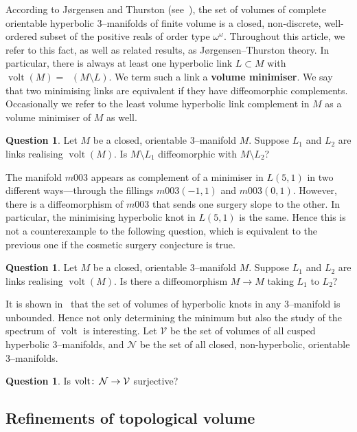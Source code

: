 \documentclass[a4paper]{gtart}
\theoremstyle{definition}
\newtheorem{question}[proposition]{Question}
\theoremstyle{remark}
\numberwithin{equation}{section}
\DeclareMathOperator{\volt}{volt}
\DeclareMathOperator{\volh}{vol_{\mathbb{H}}}
\begin{document}
According to J\o{}rgensen and Thurston (see~\cite{thurston-notes,Gro81, Mai10}), the set of volumes of complete orientable hyperbolic 3--manifolds of finite volume is a closed, non-discrete, well-ordered subset of the positive reals of order type $\omega^\omega.$ Throughout this article, we refer to this fact, as well as related results, as J\o{}rgensen--Thurston theory. In particular, there is always at least one hyperbolic link  $L \subset M$ with $\volt(M) = \volh(M\setminus L)$. We term such a link a \textbf{volume minimiser}. We say that two minimising links are equivalent if they have diffeomorphic complements. Occasionally we refer to the least volume hyperbolic link complement in $M$ as a volume minimiser of $M$ as well. 

\begin{question}
Let $M$ be a closed, orientable $3$--manifold $M$. Suppose $L_1$ and $L_2$ are links realising $\volt(M)$. Is $M \setminus L_1$ diffeomorphic with $M \setminus L_2$?
\end{question}

The manifold $m003$ appears as complement of a minimiser in $L(5,1)$ in two different ways---through the fillings $m003(-1, 1)$ and $m003(0, 1).$ However, there is a diffeomorphism of $m003$ that sends one surgery slope to the other. In particular, the minimising hyperbolic knot in $L(5,1)$ is the same. Hence this is not a counterexample to the following question, which is equivalent to the previous one if the cosmetic surgery conjecture is true.

\begin{question}
Let $M$ be a closed, orientable $3$--manifold $M$. Suppose $L_1$ and $L_2$ are links realising $\volt(M)$. Is there a diffeomorphism $M\to M$ taking  $L_1$ to $L_2$?
\end{question}

It is shown in~\cite{Adams_unbounded_volume} that the set of volumes of hyperbolic knots in any 3--manifold is unbounded. Hence not only determining the minimum but also the study of the spectrum of $\volt$ is interesting. 
Let $\mathcal{V}$ be the set of volumes of all cusped hyperbolic 3--manifolds, and $\mathcal{N}$ be the set of all closed, non-hyperbolic, orientable 3--manifolds. 
\begin{question}
Is $\volt\co \mathcal{N} \to \mathcal{V}$ surjective?
\end{question}

\subsection{Refinements of topological volume}
\label{ssec:refinements}
\end{document}
